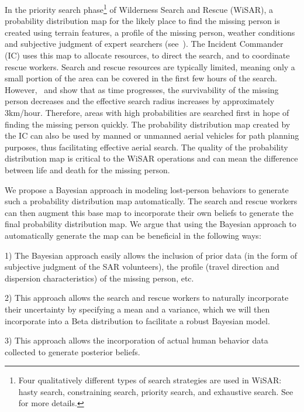 \documentclass[smallextended,natbib]{svjour3}
\begin{document}
In the priority search phase\footnote{Four qualitatively different types of search strategies are used in WiSAR: hasty search, constraining search, priority search, and exhaustive search. See~\cite{[01UAVSpecific]FieldReport} for more details.} of Wilderness Search and Rescue (WiSAR), a probability distribution map for the likely place to find the missing person is created using terrain features, a profile of the missing person, weather conditions and subjective judgment of expert searchers (see~\cite{LostPersonBehavior}). The Incident Commander (IC) uses this map to allocate resources, to direct the search, and to coordinate rescue workers. Search and rescue resources are typically limited, meaning only a small portion of the area can be covered in the first few hours of the search. However,~\cite{[01UAVSpecific]SetnickaWiSAR} and \cite{[01UAVSpecific]SyrotuckIntroToLandSearch} show that as time progresses, the survivability of the missing person decreases and the effective search radius increases by approximately 3km/hour. Therefore, areas with high probabilities are searched first in hope of finding the missing person quickly. The probability distribution map created by the IC can also be used by manned or unmanned aerial vehicles for path planning purposes, thus facilitating effective aerial search. The quality of the probability distribution map is critical to the WiSAR operations and can mean the difference between life and death for the missing person.

We propose a Bayesian approach in modeling lost-person behaviors to generate such a probability distribution map automatically. The search and rescue workers can then augment this base map to incorporate their own beliefs to generate the final probability distribution map. We argue that using the Bayesian approach to automatically generate the map can be beneficial in the following ways: 

1) The Bayesian approach easily allows the inclusion of prior data (in the form of subjective judgment of the SAR volunteers), the profile (travel direction and dispersion characteristics) of the missing person, etc.

2) This approach allows the search and rescue workers to naturally incorporate their uncertainty by specifying a mean and a variance, which we will then incorporate into a Beta distribution to facilitate a robust Bayesian model.

3) This approach allows the incorporation of actual human behavior data collected to generate posterior beliefs.
\end{document}
